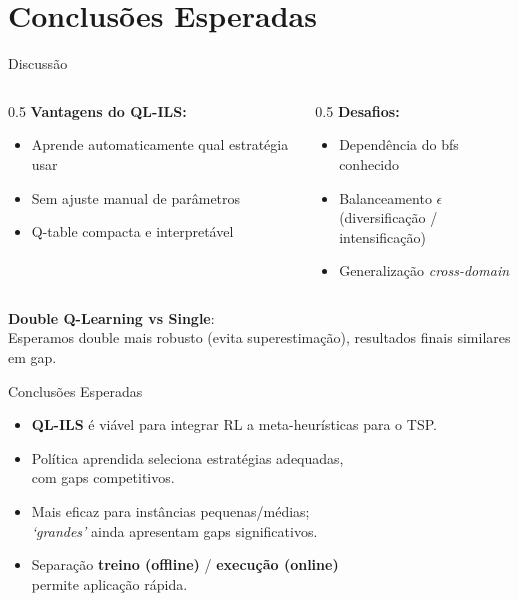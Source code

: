 \documentclass[11pt, xcolor=dvipsnames]{beamer}
\newcommand{\destaque}[1]{\textbf{\textcolor{verde}{#1}}}
\newcommand{\sutil}[1]{\textcolor{textoBase!60}{#1}}
\begin{document}
\section{Conclusões Esperadas}

\begin{frame}{Discussão}
  \footnotesize
  \begin{columns}[T]
    \begin{column}{0.5\textwidth}
      \textbf{Vantagens do QL-ILS:}
      \begin{itemize}
        \item Aprende automaticamente qual estratégia usar
        \item Sem ajuste manual de parâmetros
        \item Q-table compacta e interpretável
      \end{itemize}
    \end{column}
    \begin{column}{0.5\textwidth}
      \textbf{Desafios:}
      \begin{itemize}
        \item Dependência do bfs conhecido
        \item Balanceamento $\epsilon$ \\ \sutil{(diversificação / intensificação)}
        \item Generalização \emph{cross-domain}
      \end{itemize}
    \end{column}
  \end{columns}
  \vspace{4mm}
  \begin{calloutbox}
    {\scriptsize
    \textbf{Double Q-Learning vs Single}: \\
    Esperamos double mais robusto (evita superestimação), resultados finais similares em gap.
    }
  \end{calloutbox}
\end{frame}

\begin{frame}{Conclusões Esperadas}
  \footnotesize
  \begin{itemize}
    \item \destaque{QL-ILS} é viável para integrar RL a meta-heurísticas para o TSP.
    \item Política aprendida seleciona estratégias adequadas, \\ com gaps competitivos.
    \item Mais eficaz para instâncias pequenas/médias; \\ \emph{`grandes'} ainda apresentam gaps significativos.
    \item Separação \destaque{treino (offline)} / \destaque{execução (online)} \\ permite aplicação rápida.
  \end{itemize}
\end{frame}
\end{document}
